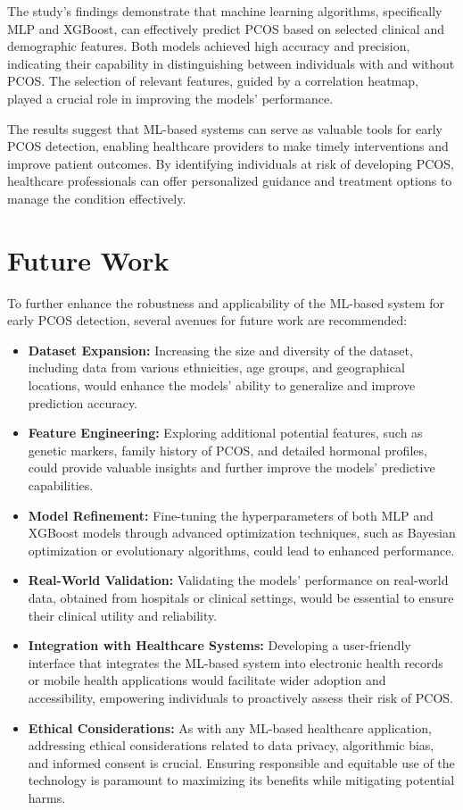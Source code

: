 \documentclass{article}
\begin{document}
The study's findings demonstrate that machine learning algorithms, specifically MLP and XGBoost, can effectively predict PCOS based on selected clinical and demographic features. Both models achieved high accuracy and precision, indicating their capability in distinguishing between individuals with and without PCOS. The selection of relevant features, guided by a correlation heatmap, played a crucial role in improving the models' performance.

The results suggest that ML-based systems can serve as valuable tools for early PCOS detection, enabling healthcare providers to make timely interventions and improve patient outcomes. By identifying individuals at risk of developing PCOS, healthcare professionals can offer personalized guidance and treatment options to manage the condition effectively.

\section*{Future Work}

To further enhance the robustness and applicability of the ML-based system for early PCOS detection, several avenues for future work are recommended:
\begin{itemize}
    \item \textbf{Dataset Expansion:} Increasing the size and diversity of the dataset, including data from various ethnicities, age groups, and geographical locations, would enhance the models' ability to generalize and improve prediction accuracy.
    \item \textbf{Feature Engineering:} Exploring additional potential features, such as genetic markers, family history of PCOS, and detailed hormonal profiles, could provide valuable insights and further improve the models' predictive capabilities.
    \item \textbf{Model Refinement:} Fine-tuning the hyperparameters of both MLP and XGBoost models through advanced optimization techniques, such as Bayesian optimization or evolutionary algorithms, could lead to enhanced performance.
    \item \textbf{Real-World Validation:} Validating the models' performance on real-world data, obtained from hospitals or clinical settings, would be essential to ensure their clinical utility and reliability.
    \item \textbf{Integration with Healthcare Systems:} Developing a user-friendly interface that integrates the ML-based system into electronic health records or mobile health applications would facilitate wider adoption and accessibility, empowering individuals to proactively assess their risk of PCOS.
    \item \textbf{Ethical Considerations:} As with any ML-based healthcare application, addressing ethical considerations related to data privacy, algorithmic bias, and informed consent is crucial. Ensuring responsible and equitable use of the technology is paramount to maximizing its benefits while mitigating potential harms.
\end{itemize}
\end{document}
